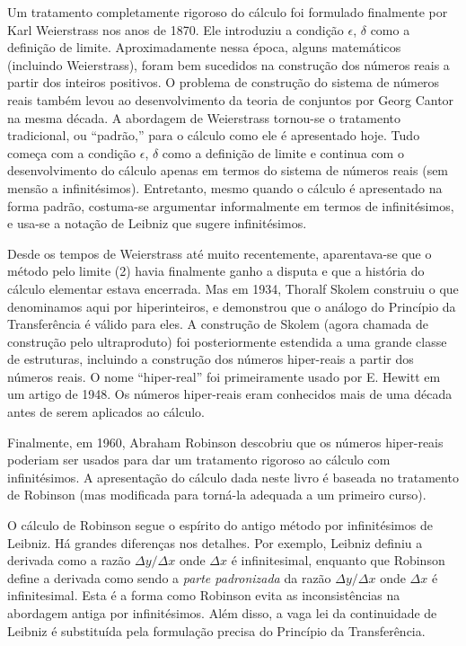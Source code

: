 Um tratamento completamente rigoroso do cálculo foi formulado finalmente
por Karl Weierstrass nos anos de 1870. Ele introduziu a condição
$\epsilon$, $\delta$ como a definição de limite. Aproximadamente nessa
época, alguns matemáticos (incluindo Weierstrass), foram bem sucedidos
na construção dos números reais a partir dos inteiros positivos. O
problema de construção do sistema de números reais também levou ao
desenvolvimento da teoria de conjuntos por Georg Cantor na mesma
década. A abordagem de Weierstrass tornou-se o tratamento tradicional,
ou ``padrão,'' para o cálculo como ele é apresentado hoje. Tudo começa
com a condição $\epsilon$, $\delta$ como a definição de limite e continua
com o desenvolvimento do cálculo apenas em termos do sistema de
números reais (sem mensão a infinitésimos). Entretanto, mesmo quando
o cálculo é apresentado na forma padrão, costuma-se argumentar
informalmente em termos de infinitésimos, e usa-se a notação de
Leibniz que sugere infinitésimos.

Desde os tempos de Weierstrass até muito recentemente, aparentava-se
que o método pelo limite (2) havia finalmente ganho a disputa e
que a história do cálculo elementar estava encerrada. Mas em 1934,
Thoralf Skolem construiu o que denominamos aqui por hiperinteiros,
e demonstrou que o análogo do Princípio da Transferência é válido para
eles. A construção de Skolem (agora chamada de construção pelo
ultraproduto) foi posteriormente estendida a uma grande classe de
estruturas, incluindo a construção dos números hiper-reais a partir
dos números reais. O nome ``hiper-real'' foi primeiramente usado por
E. Hewitt em um artigo de 1948. Os números hiper-reais eram conhecidos
mais de uma década antes de serem aplicados ao cálculo.

Finalmente, em 1960, Abraham Robinson descobriu que os números hiper-reais
poderiam ser usados para dar um tratamento rigoroso ao cálculo com
infinitésimos. A apresentação do cálculo dada neste livro é baseada
no tratamento de Robinson (mas modificada para torná-la adequada a um
primeiro curso).

O cálculo de Robinson segue o espírito do antigo método por infinitésimos
de Leibniz. Há grandes diferenças nos detalhes. Por exemplo, Leibniz
definiu a derivada como a razão $\Delta y / \Delta x$ onde $\Delta x$
é infinitesimal, enquanto que Robinson define a derivada como sendo
a \emph{parte padronizada} da razão $\Delta y / \Delta x$ onde $\Delta x$
é infinitesimal. Esta é a forma como Robinson evita as inconsistências
na abordagem antiga por infinitésimos. Além disso, a vaga lei da
continuidade de Leibniz é substituída pela formulação precisa do
Princípio da Transferência.

